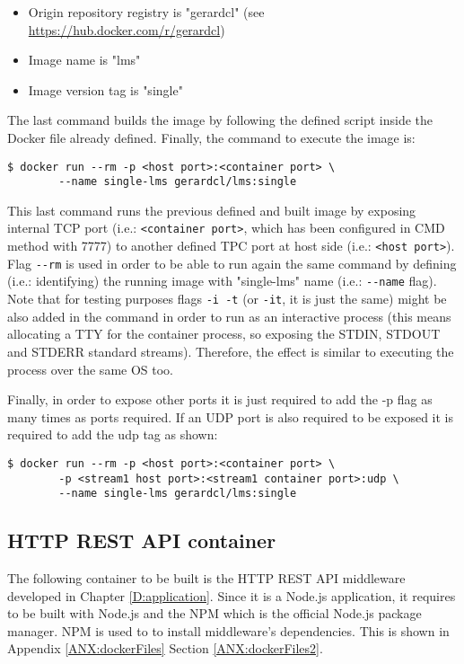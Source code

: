 \begin{itemize}
\item Origin repository registry is "gerardcl" (see \url{https://hub.docker.com/r/gerardcl})
\item Image name is "lms"
\item Image version tag is "single"
\end{itemize}

The last command builds the image by following the defined script inside the Docker file already defined. Finally, the command to execute the image is:

\begin{verbatim}
$ docker run --rm -p <host port>:<container port> \
		--name single-lms gerardcl/lms:single
\end{verbatim}

This last command runs the previous defined and built image by exposing internal TCP port (i.e.: \verb|<container port>|, which has been configured in CMD method with 7777) to another defined TPC port at host side (i.e.: \verb|<host port>|). Flag \verb|--rm| is used in order to be able to run again the same command by defining (i.e.: identifying) the running image with "single-lms" name (i.e.: \verb|--name| flag). Note that for testing purposes flags \verb|-i -t| (or \verb|-it|, it is just the same) might be also added in the command in order to run as an interactive process (this means allocating a TTY for the container process, so exposing the STDIN, STDOUT and STDERR standard streams). Therefore, the effect is similar to executing the process over the same OS too.

Finally, in order to expose other ports it is just required to add the -p flag as many times as ports required. If an UDP port is also required to be exposed it is required to add the udp tag as shown:

\begin{verbatim}
$ docker run --rm -p <host port>:<container port> \
		-p <stream1 host port>:<stream1 container port>:udp \
		--name single-lms gerardcl/lms:single
\end{verbatim}


\subsection{HTTP REST API container}

The following container to be built is the HTTP REST API middleware developed in Chapter \ref{D:application}. Since it is a Node.js application, it requires to be built with Node.js and the NPM which is the official Node.js package manager. NPM is used to to install middleware's dependencies. This is shown in Appendix \ref{ANX:dockerFiles} Section \ref{ANX:dockerFiles2}.

